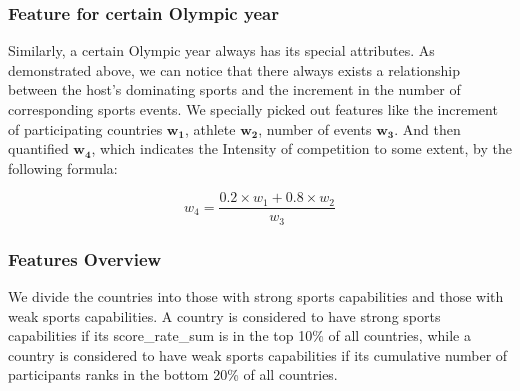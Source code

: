 \documentclass[12pt]{article}
\begin{document}
\subsubsection{Feature for certain Olympic year}

\quad \quad Similarly, a certain Olympic year always has its special attributes. As demonstrated above, we can notice that there always exists a relationship between the host's dominating sports and the increment in the number of corresponding sports events. We specially picked out features like the increment of participating countries $ \bm{w_1} $, athlete $ \bm{w_2} $, number of events $ \bm{w_3} $. And then quantified $ \bm{w_4} $, which indicates the Intensity of competition to some extent, by the following formula:

\begin{equation}\label{eq3}
    w_4 = \frac{0.2\times w_1 + 0.8 \times w_2}{w_3}
\end{equation}

\subsubsection{Features Overview}

\quad \quad We divide the countries into those with strong sports capabilities and those with weak sports capabilities. A country is considered to have strong sports capabilities if its score\_rate\_sum is in the top 10\% of all countries, while a country is considered to have weak sports capabilities if its cumulative number of participants ranks in the bottom 20\% of all countries. 
\end{document}
